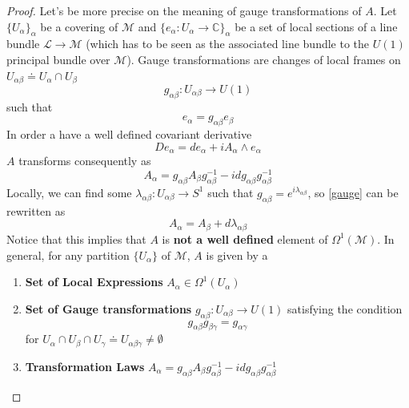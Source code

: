 \begin{proof}
Let's be more precise on the meaning of gauge transformations of $A$. Let $\{U_{\alpha}\}_{\alpha}$ be a covering of $\mathcal{M}$ and $\{e_{\alpha}: U_{\alpha} \to \mathbb{C} \}_{\alpha}$ be a set of local sections of a line bundle $\mathcal{L} \to \mathcal{M}$ (which has to be seen as the associated line bundle to the $U(1)$ principal bundle over $\mathcal{M}$). Gauge transformations are changes of local frames on $U_{\alpha \beta } \doteq U_{\alpha} \cap U_{\beta}$
\begin{equation}
    g_{\alpha \beta}: U_{\alpha \beta} \to U(1) 
\end{equation}
such that
\begin{equation}
    e_{\alpha} = g_{\alpha \beta} e_{\beta}
\end{equation}
In order a have a well defined covariant derivative
\begin{equation}
    D e_{\alpha} = d  e_{\alpha} + i A_{\alpha} \wedge e_{\alpha}
\end{equation}
$A$ transforms consequently as
\begin{equation}\label{gauge}
    A_{\alpha} = g_{\alpha \beta} A_{\beta} g_{\alpha \beta}^{-1} -  i d  g_{\alpha \beta} g_{\alpha \beta}^{-1}
\end{equation}
Locally, we can find some $\lambda_{\alpha \beta}:U_{\alpha \beta} \to S^1$ such that $g_{\alpha \beta} = e^{i \lambda_{\alpha \beta}}$, so \eqref{gauge} can be rewritten as
\begin{equation}
    A_{\alpha} = A_{\beta}  + d \lambda_{\alpha \beta}
\end{equation}
Notice that this implies that $A$ is \textbf{not a well defined} element of $\Omega^1(\mathcal{M})$. In general, for any partition $\{U_{\alpha}\}$ of $\mathcal{M}$, $A$ is given by a
\begin{enumerate}
    \item \textbf{Set of Local Expressions} $A_{\alpha} \in \Omega^1(U_{\alpha})$
    \item \textbf{Set of Gauge transformations} $g_{\alpha \beta} :U_{\alpha \beta} \to U(1)$ satisfying the condition
    \begin{equation}\label{co}
        g_{\alpha \beta} g_{\beta \gamma} = g_{\alpha \gamma} 
    \end{equation}
    for $U_{\alpha} \cap U_{\beta} \cap U_{\gamma} \doteq U_{\alpha \beta \gamma} \neq \emptyset$
    \item \textbf{Transformation Laws} $ A_{\alpha} = g_{\alpha \beta} A_{\beta} g_{\alpha \beta}^{-1} -  i d  g_{\alpha \beta} g_{\alpha \beta}^{-1}$  
\end{enumerate}


\end{proof}
